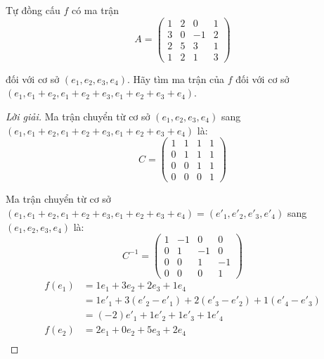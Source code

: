 \documentclass[class=nhvh-linear-algebra,crop=false]{standalone}
\begin{document}
\begin{exercise}
    Tự đồng cấu $f$ có ma trận
    \[
        A =
        \begin{pmatrix}
            1 & 2 & 0  & 1 \\
            3 & 0 & -1 & 2 \\
            2 & 5 & 3  & 1 \\
            1 & 2 & 1  & 3
        \end{pmatrix}
    \]
    \par đối với cơ sở $(e_{1}, e_{2}, e_{3}, e_{4})$. Hãy tìm ma trận của $f$ đối với cơ sở $(e_{1}, e_{1} + e_{2}, e_{1} + e_{2} + e_{3}, e_{1} + e_{2} + e_{3} + e_{4})$.
\end{exercise}

\begin{proof}[Lời giải]
    Ma trận chuyển từ cơ sở $(e_{1}, e_{2}, e_{3}, e_{4})$ sang $(e_{1}, e_{1} + e_{2}, e_{1} + e_{2} + e_{3}, e_{1} + e_{2} + e_{3} + e_{4})$ là:
    \[
        C =
        \begin{pmatrix}
            1 & 1 & 1 & 1 \\
            0 & 1 & 1 & 1 \\
            0 & 0 & 1 & 1 \\
            0 & 0 & 0 & 1
        \end{pmatrix}
    \]
    \par Ma trận chuyển từ cơ sở $(e_{1}, e_{1} + e_{2}, e_{1} + e_{2} + e_{3}, e_{1} + e_{2} + e_{3} + e_{4}) = (e'_{1}, e'_{2}, e'_{3}, e'_{4})$ sang $(e_{1}, e_{2}, e_{3}, e_{4})$ là:
    \[
        C^{-1} =
        \begin{pmatrix}
            1 & -1 & 0  & 0  \\
            0 & 1  & -1 & 0  \\
            0 & 0  & 1  & -1 \\
            0 & 0  & 0  & 1
        \end{pmatrix}
    \]
    \begin{align*}
        f(e_{1}) & = 1e_{1} + 3e_{2} + 2e_{3} + 1e_{4}                                         \\
                 & = 1e'_{1} + 3(e'_{2} - e'_{1}) + 2(e'_{3} - e'_{2}) + 1(e'_{4} - e'_{3})    \\
                 & = (-2)e'_{1} + 1e'_{2} + 1e'_{3} + 1e'_{4}                                  \\
        f(e_{2}) & = 2e_{1} + 0e_{2} + 5e_{3} + 2e_{4}                                         \\

\end{align*}
\end{proof}
\end{document}
